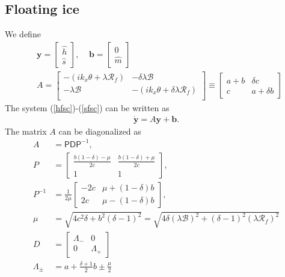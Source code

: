 \documentclass[paper=a4, fontsize=11pt]{article}
\begin{document}
\subsection*{Floating ice}
We define
\begin{align}
&\pmb{y} = \begin{bmatrix}
\widehat{h} \\
\widehat{s}
\end{bmatrix}, \;\;\;\;
\pmb{b} =
\begin{bmatrix}
0\\
\widehat{m}
\end{bmatrix}\\
&{A} = \begin{bmatrix}
-(ik_x \theta  + \lambda \mathcal{R}_f) & -\delta\lambda\mathcal{B} \\
-\lambda\mathcal{B} & -(ik_x \theta  + \delta\lambda\mathcal{R}_f) \\
\end{bmatrix} \equiv
\begin{bmatrix}
a+b & \delta c \\
c & a+\delta b
\end{bmatrix}
\label{Amat}
\end{align}
The system (\ref{hfsc})-(\ref{sfsc}) can be written as
\begin{align}
\dot{\pmb{y}} = {A}\pmb{y} + \pmb{b}.
\end{align}
The matrix ${A}$ can be diagonalized as
\begin{align}
{A} &= \mathsf{P}\mathsf{D}\mathsf{P}^{-1},\\
{P} &= \begin{bmatrix}
\frac{b(1-\delta)-\mu}{2c} & \frac{b(1-\delta)+\mu}{2c} \\
1 & 1
\end{bmatrix},\\
{P}^{-1} &= \frac{1}{2\mu}\begin{bmatrix}
-2c &  \mu+(1-\delta)b \\
2c &  \mu-(1-\delta)b
\end{bmatrix},\\
\mu &= \sqrt{4c^2 \delta + b^2(\delta-1)^2} = \sqrt{4\delta(\lambda\mathcal{B})^2 + (\delta-1)^2(\lambda\mathcal{R}_f)^2 } \label{mu}\\
{D} &= \begin{bmatrix}
\Lambda_-  & 0 \\
0 & \Lambda_+
\end{bmatrix} \\
\Lambda_\pm &= a+\frac{\delta+1}{2}b \pm \frac{\mu}{2} \label{Lambda}
\end{align}
\end{document}
